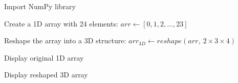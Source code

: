 \begin{algorithm}
\caption{Reshape a 1D NumPy Array into a 3D Array}
\begin{algorithmic}[1]

\STATE Import NumPy library

\STATE Create a 1D array with 24 elements:
\STATE $arr \gets [0, 1, 2, \dots, 23]$

\STATE Reshape the array into a 3D structure:
\STATE $arr_{3D} \gets reshape(arr,\ 2 \times 3 \times 4)$

\STATE Display original 1D array

\STATE Display reshaped 3D array

\end{algorithmic}
\end{algorithm}